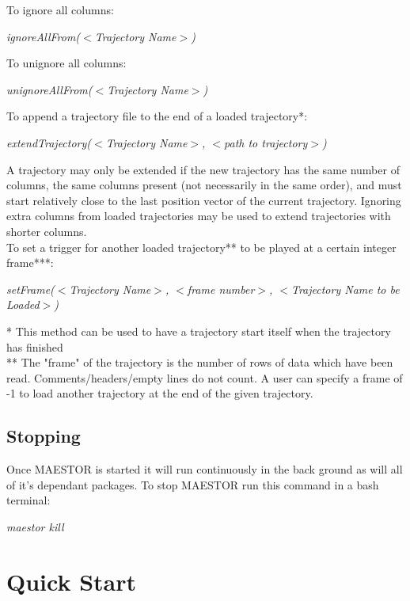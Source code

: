 \documentclass[12pt]{article}
\begin{document}
To ignore all columns:
    \begin{center}
    	\textit{ignoreAllFrom($<$Trajectory Name$>$)}
	\end{center}

To unignore all columns: 
    \begin{center}
    	\textit{unignoreAllFrom($<$Trajectory Name$>$)}
	\end{center}

To append a trajectory file to the end of a loaded trajectory*:
    \begin{center}
    	\textit{extendTrajectory($<$Trajectory Name$>$, $<$path to trajectory$>$)}
    \end{center}

\noindent * A trajectory may only be extended if the new trajectory has the same number of columns, the same columns present (not 
necessarily in the same order), and must start relatively close to the last position vector of the current trajectory.
Ignoring extra columns from loaded trajectories may be used to extend trajectories with shorter columns.\\

\noindent To set a trigger for another loaded trajectory** to be played at a certain integer frame***:
    \begin{center}
    	\textit{setFrame($<$Trajectory Name$>$, $<$frame number$>$, $<$Trajectory Name to be Loaded$>$)}
    \end{center}

\noindent ** This method can be used to have a trajectory start itself when the trajectory has finished\\

\noindent *** The "frame" of the trajectory is the number of rows of data which have been read. Comments/headers/empty lines do not count.
A user can specify a frame of -1 to load another trajectory at the end of the given trajectory.

\subsection{Stopping}

Once MAESTOR is started it will run continuously in the back ground as will all of it's dependant packages. To stop MAESTOR run this command in a bash terminal:
	\begin{center}
		\textit{maestor kill}
	\end{center}

	
\section{Quick Start} \label{quickStart}
\end{document}
